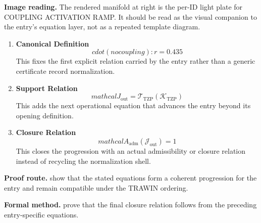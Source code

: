 \begin{samepage}
\noindent\begin{minipage}[t]{0.45\linewidth}
\vspace{0pt}
\raggedright
\scriptsize\textbf{Image reading.} The rendered manifold at right is the per-ID light plate for COUPLING ACTIVATION RAMP. It should be read as the visual companion to the entry's equation layer, not as a repeated template diagram.\par
\end{minipage}\hfill
\begin{minipage}[t]{0.53\linewidth}
\vspace*{-0.10in}
\raggedright
{}
\end{minipage}
\end{samepage}

\clearpage


\begin{enumerate}[leftmargin=1.6em,itemsep=9pt,topsep=6pt]
\item \textbf{Canonical Definition}
\[
cdot (no coupling): r = 0.435
\]
This fixes the first explicit relation carried by the entry rather than a generic certificate record normalization.

\item \textbf{Support Relation}
\[
mathcal{J}_{\mathrm{out}} = \mathcal{T}_{\mathrm{TZP}}\!\left(\mathcal{K}_{\mathrm{TZP}}\right)
\]
This adds the next operational equation that advances the entry beyond its opening definition.

\item \textbf{Closure Relation}
\[
mathcal{A}_{\mathrm{adm}}\!\left(\mathcal{J}_{\mathrm{out}}\right)=1
\]
This closes the progression with an actual admissibility or closure relation instead of recycling the normalization shell.
\end{enumerate}

\textbf{Proof route.} show that the stated equations form a coherent progression for the entry and remain compatible under the TRAWIN ordering.

\textbf{Formal method.} prove that the final closure relation follows from the preceding entry-specific equations.

\medskip
{}


